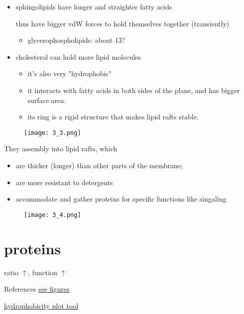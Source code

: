 \begin{itemize}
	\item
	sphingolipids have longer and straighter fatty acids
	
	thus have bigger vdW forces to hold themselves together (transiently)
	
	\begin{itemize}
		\item
		glycerophospholipids: about 13?
	\end{itemize}
	\item
	cholesterol can hold more lipid molecules
	
	\begin{itemize}
		\item
		it's also very "hydrophobic"
		\item
		it interacts with fatty acids in both sides of the plane, and has
		bigger surface area.
		\item
		its ring is a rigid structure that makes lipid rafts stable.
	\end{itemize}
\end{itemize}

\begin{figure}
	\centering
	\texttt{[image: 3\_3.png]}
\end{figure}

They assembly into lipid rafts, which

\begin{itemize}
	\item
	are thicker (longer) than other parts of the membrane;
	\item
	are more resistant to detergents
	\item
	accommodate and gather proteins for specific functions like singaling
\end{itemize}

\begin{figure}
	\centering
	\texttt{[image: 3\_4.png]}
\end{figure}

\hypertarget{proteins}{%
	\section{proteins}\label{proteins}}

ratio \(\uparrow\), function \(\uparrow\)

\begin{emptytcb*}{References}{}
\href{https://en.wikipedia.org/wiki/Membrane_protein}{see figures}

\href{https://www.expasy.org/resources/protscale}{hydrophobicity plot tool}

\end{emptytcb*}

